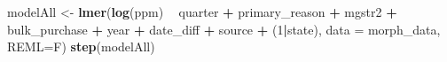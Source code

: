 \documentclass[
  11pt,
]{article}
\newenvironment{Shaded}{\begin{snugshade}}{\end{snugshade}}
\newcommand{\DataTypeTok}[1]{\textcolor[rgb]{0.13,0.29,0.53}{#1}}
\newcommand{\DecValTok}[1]{\textcolor[rgb]{0.00,0.00,0.81}{#1}}
\newcommand{\KeywordTok}[1]{\textcolor[rgb]{0.13,0.29,0.53}{\textbf{#1}}}
\newcommand{\NormalTok}[1]{#1}
\newcommand{\OperatorTok}[1]{\textcolor[rgb]{0.81,0.36,0.00}{\textbf{#1}}}
\newcommand{\StringTok}[1]{\textcolor[rgb]{0.31,0.60,0.02}{#1}}
\begin{document}
\begin{Shaded}
\end{Shaded}

\begin{Shaded}
\begin{Highlighting}[]
\NormalTok{modelAll <-}\StringTok{ }\KeywordTok{lmer}\NormalTok{(}\KeywordTok{log}\NormalTok{(ppm) }\OperatorTok{~}\StringTok{ }\NormalTok{quarter }\OperatorTok{+}\StringTok{ }\NormalTok{primary_reason }\OperatorTok{+}\StringTok{ }\NormalTok{mgstr2 }\OperatorTok{+}\StringTok{ }\NormalTok{bulk_purchase }
                 \OperatorTok{+}\StringTok{ }\NormalTok{year }\OperatorTok{+}\StringTok{ }\NormalTok{date_diff }\OperatorTok{+}\StringTok{ }\NormalTok{source }\OperatorTok{+}\StringTok{ }\NormalTok{(}\DecValTok{1}\OperatorTok{|}\NormalTok{state), }\DataTypeTok{data =}\NormalTok{ morph_data, }
                 \DataTypeTok{REML=}\NormalTok{F)}
\KeywordTok{step}\NormalTok{(modelAll)}
\end{Highlighting}
\end{Shaded}
\end{document}
